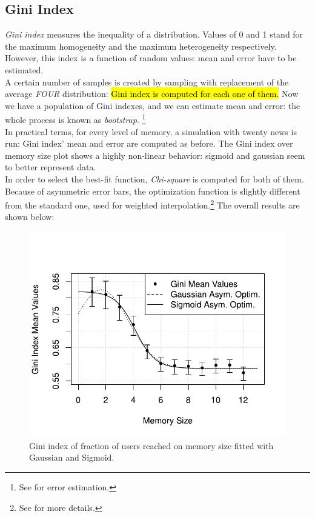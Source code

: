 \subsection{Gini Index}
\textit{Gini index}\cite{ginindex} measures the inequality of a
distribution. Values of 0 and 1 stand for the
maximum homogeneity and the maximum heterogeneity respectively.
However, this index is a function of random values: mean and
error have to be estimated.\\
A certain number of samples is created by sampling with replacement
of the average \textit{FOUR} distribution: \hl{Gini index is
computed for each one of them.}
Now we have a population of Gini indexes, and we can estimate
mean and error: the whole process is known as
\textit{bootstrap}.
\footnote{See  for error estimation.}
\cite{bootstrap}\\
In practical terms, for every level of  memory, a simulation with
twenty news is run: Gini index' mean and error are computed
as before.
The Gini index over memory size plot shows a highly non-linear
behavior: sigmoid and gaussian seem to better represent data.\\
In order to select the best-fit function, \textit{Chi-square} is
computed for both of them. \\
Because of asymmetric error bars, the optimization function is
slightly different from the standard one, used for weighted
interpolation.\footnote{See  for more details.}
The overall results are shown below:
%
%
\begin{figure}[h]
  \centering
  \includegraphics[trim={0cm 0cm 0cm 1cm},clip,width=.8\columnwidth]{img/gini.pdf}
  \caption[Gini index on memory size]
  {Gini index of fraction of users reached on memory size
    fitted with Gaussian and Sigmoid.
  }
  \label{fig:gini}
\end{figure}
